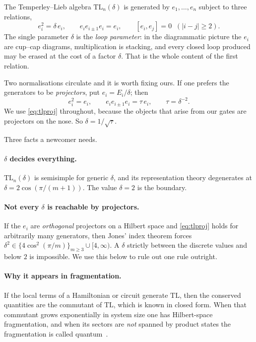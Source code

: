 \documentclass[11pt]{article}
\theoremstyle{plain}
\theoremstyle{remark}
\begin{document}
The Temperley--Lieb algebra $\mathrm{TL}_n(\delta)$ is generated by
$e_1,\dots,e_{n}$ subject to three relations,
\begin{equation}
  e_i^2 = \delta\, e_i, \qquad
  e_i e_{i\pm1} e_i = e_i, \qquad
  [e_i, e_j] = 0 \;\; (|i-j| \ge 2).
  \label{eq:tl}
\end{equation}
The single parameter $\delta$ is the \emph{loop parameter}: in the diagrammatic
picture the $e_i$ are cup--cap diagrams, multiplication is stacking, and every
closed loop produced may be erased at the cost of a factor $\delta$. That is the
whole content of the first relation.

Two normalisations circulate and it is worth fixing ours. If one prefers the
generators to be \emph{projectors}, put $e_i = E_i/\delta$; then
\begin{equation}
  e_i^2 = e_i, \qquad e_i e_{i\pm1} e_i = \tau\, e_i, \qquad \tau = \delta^{-2}.
  \label{eq:tlproj}
\end{equation}
We use \eqref{eq:tlproj} throughout, because the objects that arise from our
gates are projectors on the nose. So $\delta = 1/\sqrt\tau$.

Three facts a newcomer needs.

\paragraph{$\delta$ decides everything.} $\mathrm{TL}_n(\delta)$ is semisimple
for generic $\delta$, and its representation theory degenerates at
$\delta = 2\cos(\pi/(m+1))$. The value $\delta = 2$ is the boundary.

\paragraph{Not every $\delta$ is reachable by projectors.} If the $e_i$ are
\emph{orthogonal} projectors on a Hilbert space and \eqref{eq:tlproj} holds for
arbitrarily many generators, then Jones' index theorem forces
$\delta^2 \in \{4\cos^2(\pi/m)\}_{m\ge3} \cup [4,\infty)$. A $\delta$ strictly
between the discrete values and below $2$ is impossible. We use this below to
rule out one rule outright.

\paragraph{Why it appears in fragmentation.} If the local terms of a Hamiltonian
or circuit generate $\mathrm{TL}$, then the conserved quantities are the
commutant of $\mathrm{TL}$, which is known in closed form. When that commutant
grows exponentially in system size one has Hilbert-space fragmentation, and when
its sectors are \emph{not} spanned by product states the fragmentation is called
quantum~\cite{MM2022, Li2023}.
\end{document}
